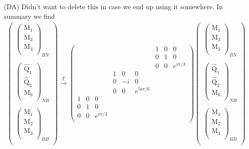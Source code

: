 \documentclass[12pt,a4paper]{article}
\newcounter{arrow}
\newcommand{\dave}[1]{{\color{ao(english)}\footnotesize{(DA) #1}}}
\begin{document}
\dave{Didn't want to delete this in case we end up using it somewhere.}
In summary we find
\begin{align}
\left(\begin{matrix}
\left( \begin{matrix}
\text{M}_1\\
\text{M}_2\\
\text{M}_3\\
\end{matrix} \right)_{BN} \\
\\
\left( \begin{matrix}
\widehat{\text{Q}}_1\\
\widehat{\text{Q}}_2\\
\text{M}_6\\
\end{matrix} \right)_{NB}\\
\\
\left( \begin{matrix}
\text{M}_1\\
\text{M}_2\\
\text{M}_3\\
\end{matrix} \right)_{BB} \\
\end{matrix} \right)
\xrightarrow{T} \left( \begin{matrix}
&&&			&&&			1&0&0	\\
&&&			&&&			0&1&0	\\
&&&			&&&			0&0&e^{i \pi/3}	\\
&&&			1&0&0&			&&	\\
&&&			0&-i&0&			&&	\\
&&&			0&0&e^{5 i \pi /6}&			&&	\\
1&0&0&			&&&			&&	\\
0&1&0&			&&&			&&	\\
0&0&e^{i \pi /3}&			&&&			&&	\\		
\end{matrix} \right)
\left(\begin{matrix}
\left( \begin{matrix}
\text{M}_1\\
\text{M}_2\\
\text{M}_3\\
\end{matrix} \right)_{BN} \\
\\
\left( \begin{matrix}
\widehat{\text{Q}}_1\\
\widehat{\text{Q}}_2\\
\text{M}_6\\
\end{matrix} \right)_{NB}\\
\\
\left( \begin{matrix}
\text{M}_1\\
\text{M}_2\\
\text{M}_3\\
\end{matrix} \right)_{BB} \\
\end{matrix} \right)
\end{align}
\end{document}
